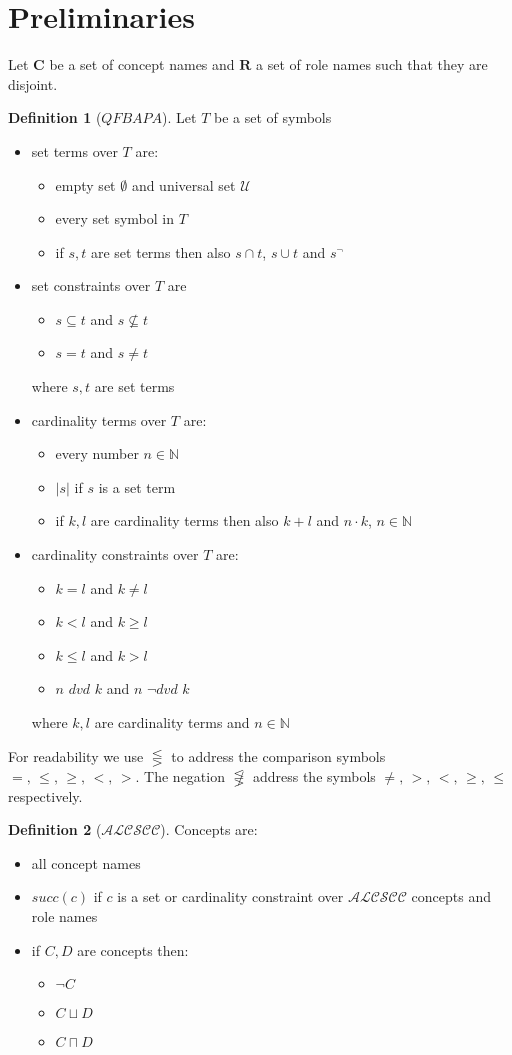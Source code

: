 \documentclass[a4paper,11pt]{scrartcl}
\theoremstyle{break}
\theoremstyle{definition}
\newtheorem{mydef}{Definition}
\begin{document}
\section{Preliminaries}
Let $\mathbf{C}$ be a set of concept names and $\mathbf{R}$ a set of role names such that they are disjoint.
\begin{mydef}[$QFBAPA$]
Let $T$ be a set of symbols
\begin{itemize}
\item set terms over $T$ are:
\begin{itemize}
\item empty set $\emptyset$ and universal set $
\mathcal{U}$
\item every set symbol in $T$
\item if $s,t$ are set terms then also $s\cap t$, $s\cup t$ and $s^{\neg}$
\end{itemize}
\item set constraints over $T$ are
\begin{itemize}
\item $s\subseteq t$ and $s\not\subseteq t$
\item $s=t$ and $s\neq t$
\end{itemize}
where $s,t$ are set terms
\item cardinality terms over $T$ are:
\begin{itemize}
\item every number $n\in \mathbb{N}$
\item $|s|$ if $s$ is a set term
\item if $k,l$ are cardinality terms then also $k+l$ and $n\cdot k$, $n\in \mathbb{N}$
\end{itemize}
\item cardinality constraints over $T$ are:
\begin{itemize}
\item $k=l$ and $k\neq l$
\item $k<l$ and $k\geq l$
\item $k\leq l$ and $k>l$
\item $n$ $dvd$ $k$ and $n$ $\neg dvd$ $k$
\end{itemize}
where $k,l$ are cardinality terms and $n\in\mathbb{N}$
\end{itemize}
For readability we use $\lesseqgtr$ to address the comparison symbols $=,\,\leq,\,\geq,\,<,\,>$. The negation $\not\lesseqgtr$ address the symbols $\neq,\,>,\,<,\,\geq,\,\leq$ respectively.
\end{mydef}
\begin{mydef}[$\mathcal{ALCSCC}$]
Concepts are:
\begin{itemize}
\item all concept names
\item $succ(c)$ if $c$ is a set or cardinality constraint over $\mathcal{ALCSCC}$ concepts and role names
\item if $C,D$ are concepts then:
\begin{itemize}
\item $\neg C$
\item $C\sqcup D$
\item $C\sqcap D$
\end{itemize}
\end{itemize}
\end{mydef}
\end{document}

